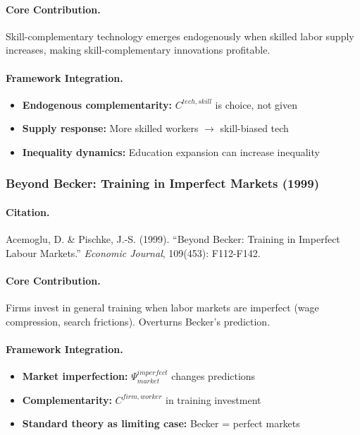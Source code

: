 \documentclass[12pt,a4paper]{article}
\begin{document}
\paragraph{Core Contribution.}
Skill-complementary technology emerges endogenously when skilled labor
supply increases, making skill-complementary innovations profitable.

\paragraph{Framework Integration.}
\begin{itemize}
  \item \textbf{Endogenous complementarity:} $C^{tech,skill}$ is choice, not given
  \item \textbf{Supply response:} More skilled workers $\to$ skill-biased tech
  \item \textbf{Inequality dynamics:} Education expansion can increase inequality
\end{itemize}

\subsubsection{Beyond Becker: Training in Imperfect Markets (1999)}

\paragraph{Citation.}
Acemoglu, D. \& Pischke, J.-S. (1999).
``Beyond Becker: Training in Imperfect Labour Markets.''
\emph{Economic Journal}, 109(453): F112-F142.

\paragraph{Core Contribution.}
Firms invest in general training when labor markets are imperfect
(wage compression, search frictions). Overturns Becker's prediction.

\paragraph{Framework Integration.}
\begin{itemize}
  \item \textbf{Market imperfection:} $\Psi_{market}^{imperfect}$ changes predictions
  \item \textbf{Complementarity:} $C^{firm,worker}$ in training investment
  \item \textbf{Standard theory as limiting case:} Becker = perfect markets
\end{itemize}
\end{document}
